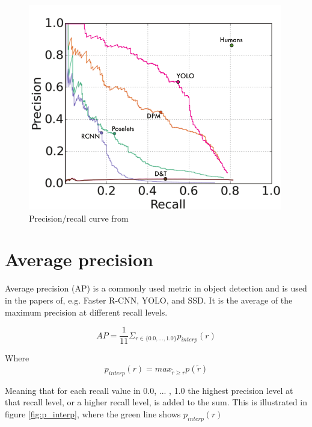 \begin{figure}[h!]
    \centering
    \includegraphics[scale=0.4]{fig/yolo_prec_recall.png} 
    \caption{Precision/recall curve from \citep{YOLOv1}}
    \label{fig:yolo_prec_recall}
\end{figure}

\section{Average precision}
Average precision (AP) is a commonly used metric in object detection and is used in the papers of, e.g. Faster R-CNN, YOLO, and SSD. It is the average of the maximum precision at different recall levels.

\begin{equation}
    AP = \frac{1}{11} \Sigma_{r \in \{0.0, ... , 1.0\}} p_{interp}(r)
\end{equation}

Where
\begin{equation}
    p_{interp}(r) = max_{\tilde{r} \geq r} p(\tilde{r})
\end{equation}

Meaning that for each recall value in {0.0, ... , 1.0} the highest precision level at that recall level, or a higher recall level, is added to the sum. This is illustrated in figure \ref{fig:p_interp}, where the green line shows $p_{interp}(r)$

